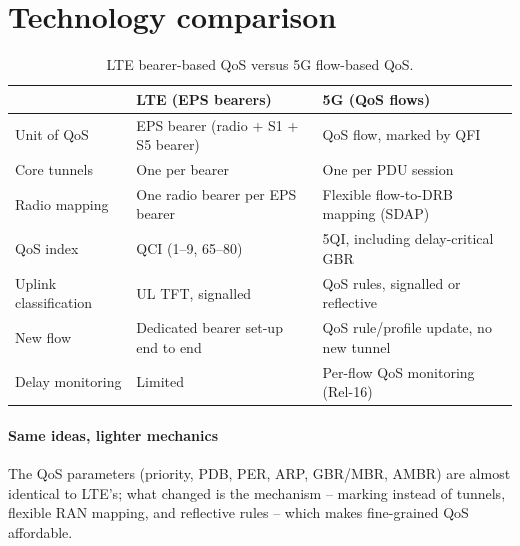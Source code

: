 \documentclass[11pt,a4paper]{article}
\begin{document}
\section{Technology comparison}
\begin{table}[htbp]
\centering\small
\caption{LTE bearer-based QoS versus 5G flow-based QoS.}\label{tab:cmp}
\begin{tabularx}{\linewidth}{@{}l Y Y@{}}
\toprule
{} & LTE (EPS bearers) & 5G (QoS flows) \\
\midrule
Unit of QoS          & EPS bearer (radio + S1 + S5 bearer) & QoS flow, marked by QFI \\
Core tunnels         & One per bearer                      & One per PDU session \\
Radio mapping        & One radio bearer per EPS bearer     & Flexible flow-to-DRB mapping (SDAP) \\
QoS index            & QCI (1--9, 65--80)                  & 5QI, including delay-critical GBR \\
Uplink classification & UL TFT, signalled                  & QoS rules, signalled or reflective \\
New flow             & Dedicated bearer set-up end to end  & QoS rule/profile update, no new tunnel \\
Delay monitoring     & Limited                             & Per-flow QoS monitoring (Rel-16) \\
\bottomrule
\end{tabularx}
\end{table}

\paragraph{Same ideas, lighter mechanics} The QoS parameters (priority, PDB, PER, ARP, GBR/MBR, AMBR) are almost identical to LTE's; what changed is the
mechanism -- marking instead of tunnels, flexible RAN mapping, and reflective rules -- which makes fine-grained QoS affordable.

\end{document}
